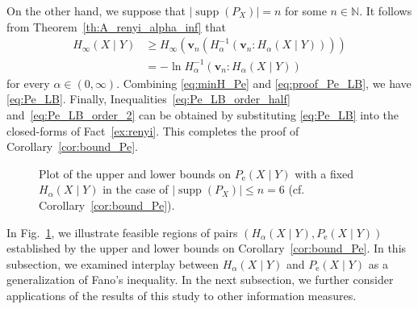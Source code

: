 \documentclass[conference, draftcls, onecolumn]{IEEEtran}
\theoremstyle{plain}
\newcommand{\bvec}[1]{\boldsymbol{#1}}
\newcommand{\supp}{\operatorname{supp}}
\newcommand{\figref}[1]{Fig.~\ref{#1}}
\newcommand{\factref}[1]{Fact~\ref{#1}}
\newcommand{\thref}[1]{Theorem~\ref{#1}}
\newcommand{\corref}[1]{Corollary~\ref{#1}}
\begin{document}
\begin{IEEEproof}[Proof of \corref{cor:bound_Pe}]
On the other hand, we suppose that $|\!\supp( P_{X} )| = n$ for some $n \in \mathbb{N}$.
It follows from \thref{th:A_renyi_alpha_inf} that
\begin{align}
H_{\infty}(X \mid Y)
& \ge
H_{\infty}( \bvec{v}_{n}( H_{\alpha}^{-1}( \bvec{v}_{n} : H_{\alpha}(X \mid Y) ) ) )
\\
& =
- \ln H_{\alpha}^{-1}( \bvec{v}_{n} : H_{\alpha}(X \mid Y) )
\label{eq:proof_Pe_LB}
\end{align}
for every $\alpha \in (0, \infty)$.
Combining \eqref{eq:minH_Pe} and \eqref{eq:proof_Pe_LB}, we have \eqref{eq:Pe_LB}.
Finally, Inequalities~\eqref{eq:Pe_LB_order_half} and~\eqref{eq:Pe_LB_order_2} can be obtained by substituting \eqref{eq:Pe_LB} into the closed-forms of \factref{ex:renyi}.
This completes the proof of \corref{cor:bound_Pe}.
\end{IEEEproof}




\begin{figure}[!t]
\centering
{}\hfill
{}
\caption{Plot of the upper and lower bounds on $P_{\mathrm{e}}(X \mid Y)$ with a fixed $H_{\alpha}(X \mid Y)$ in the case of $|\!\supp( P_{X} )| \le n = 6$ (cf. \corref{cor:bound_Pe}).}
\label{fig:Pe_H}
\end{figure}


In \figref{fig:Pe_H}, we illustrate feasible regions of pairs $(H_{\alpha}(X \mid Y), P_{\mathrm{e}}(X \mid Y))$ established by the upper and lower bounds on \corref{cor:bound_Pe}.
In this subsection, we examined interplay between $H_{\alpha}(X \mid Y)$ and $P_{\mathrm{e}}(X \mid Y)$ as a generalization of Fano's inequality.
In the next subsection, we further consider applications of the results of this study to other information measures.
\end{document}
